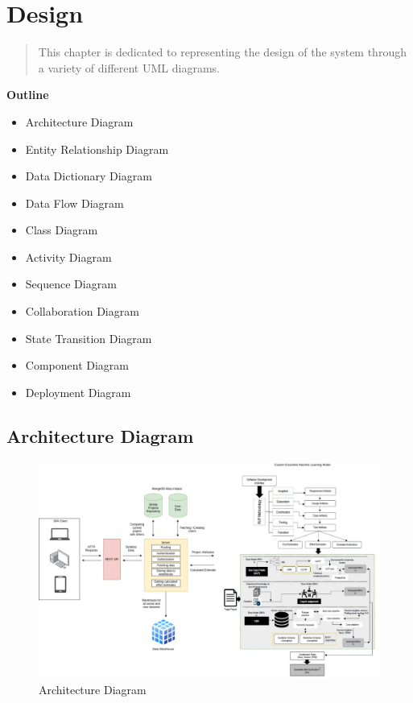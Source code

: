 
\section{Design}

\vspace{20mm}



\begin{abstract}

    This chapter is dedicated to representing the design of the system through a variety of different UML diagrams.


\end{abstract}

\vspace{20mm}

\large{\textbf{Outline}}

\begin{center}
    \begin{itemize}
        \item Architecture Diagram
        \item Entity Relationship Diagram
        \item Data Dictionary Diagram
        \item Data Flow Diagram
        \item Class Diagram
        \item Activity Diagram
        \item Sequence Diagram
        \item Collaboration Diagram
        \item State Transition Diagram
        \item Component Diagram
        \item Deployment Diagram
    \end{itemize}
\end{center}
\pagebreak


\subsection{Architecture Diagram}
\begin{figure}[H]
    \centering
    \includegraphics[scale=0.4]{./diagrams/architecture-diagram.jpeg}
    \caption{Architecture Diagram}
    \label{fig:arch-diag}

\end{figure}


